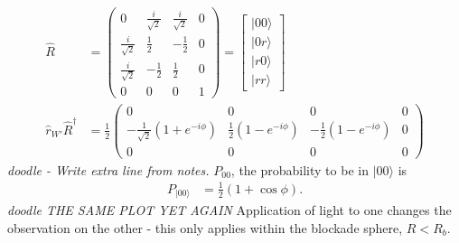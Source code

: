 \documentclass[lasers.tex]{subfiles}
\begin{document}
\begin{align}
    \hat{R} &= \begin{pmatrix} 0 & \frac{i}{\sqrt{2}} & \frac{i}{\sqrt{2}} & 0 \\ \frac{i}{\sqrt{2}} & \frac12 & -\frac12 & 0 \\ \frac{i}{\sqrt{2}} & -\frac12 & \frac12 & 0 \\ 0 & 0 & 0 & 1 \end{pmatrix} = \begin{bmatrix} |00\rangle \\ |0r\rangle \\ |r0\rangle \\ |rr\rangle \end{bmatrix} \\
    \hat{r}_{W'}\hat{R}^\dagger &= \frac12 \begin{pmatrix} 0 & 0 & 0 & 0 \\ -\frac{1}{\sqrt{2}}\left(1+e^{-i\phi}\right) & \frac12(1-e^{-i\phi}) & -\frac12(1-e^{-i\phi}) & 0 \\ 0 & 0 & 0 & 0 \end{pmatrix}
\end{align}
\emph{doodle - Write extra line from notes.}
$P_{00}$, the probability to be in $|00\rangle$ is
\begin{align}
    P_{|00\rangle} &= \frac12(1+\cos\phi).
\end{align}
\emph{doodle THE SAME PLOT YET AGAIN}
Application of light to one changes the observation on the other - this only applies within the blockade sphere, $R<R_b$. 
\end{document}
